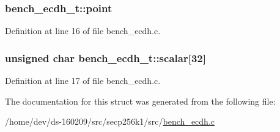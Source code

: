 \subsubsection[{point}]{ bench\+\_\+ecdh\+\_\+t\+::point}\label{structbench__ecdh__t_aa2d9806cee2be627fc76ce1bca9dd5e8}


Definition at line 16 of file bench\+\_\+ecdh.\+c.

\hypertarget{structbench__ecdh__t_a2641f51e954a515683720afab29009c4}{}
\subsubsection[{scalar}]{\setlength{\rightskip}{0pt plus 5cm}unsigned char bench\+\_\+ecdh\+\_\+t\+::scalar\mbox{[}32\mbox{]}}\label{structbench__ecdh__t_a2641f51e954a515683720afab29009c4}


Definition at line 17 of file bench\+\_\+ecdh.\+c.



The documentation for this struct was generated from the following file\+:\begin{DoxyCompactItemize}
\item 
/home/dev/ds-\/160209/src/secp256k1/src/\hyperlink{bench__ecdh_8c}{bench\+\_\+ecdh.\+c}\end{DoxyCompactItemize}

